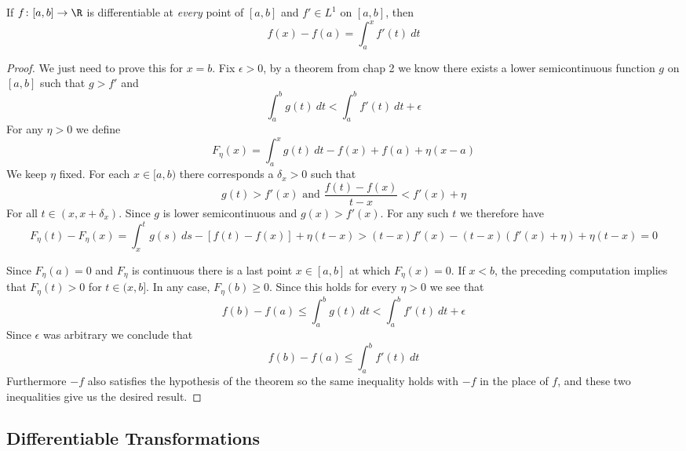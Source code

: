 \begin{theorem}
If $f\colon [a,b]\rightarrow \R$ is differentiable at \textit{every} point of $[a,b]$ and $f'\in L^1$ on $[a,b]$, then \[
    f(x)-f(a) = \int_a^x f'(t)~dt    
\]
\begin{proof}
    We just need to prove this for $x=b$. Fix $\epsilon>0$, by a theorem from chap 2 we know there exists a lower semicontinuous function $g$ on $[a,b]$ such that $g>f'$ and \[
        \int_a^b g(t)~dt<\int_a^b f'(t)~dt+\epsilon    
    \]
    For any $\eta>0$ we define \[
        F_\eta(x) = \int_a^x g(t)~dt - f(x)+f(a)+\eta(x-a)    
    \]
    We keep $\eta$ fixed. For each $x\in [a,b)$ there corresponds a $\delta_x>0$ such that\[
        g(t)>f'(x) \text{ and }\frac{f(t)-f(x)}{t-x}<f'(x)+\eta    
    \]
    For all $t\in (x,x+\delta_x)$. Since $g$ is lower semicontinuous and $g(x)>f'(x)$. For any such $t$ we therefore have\[
        F_\eta(t) - F_\eta(x) = \int_x^t g(s)~ds - [f(t)-f(x)]+\eta(t-x) > (t-x)f'(x)-(t-x)(f'(x)+\eta)+\eta(t-x) = 0    
    \]

    Since $F_\eta(a) = 0$ and $F_\eta$ is continuous there is a last point $x\in [a,b]$ at which $F_\eta(x) = 0$. If $x<b$, the preceding computation implies that $F_\eta(t)>0$ for $t\in (x,b]$. In any case, $F_\eta(b)\geq 0$. Since this holds for every $\eta>0$ we see that \[
    f(b)-f(a)\leq \int_a^b g(t)~dt< \int_a^b f'(t)~dt + \epsilon    
\] 
    Since $\epsilon$ was arbitrary we conclude that \[f(b)-f(a)\leq \int_a^b f'(t)~dt\] Furthermore $-f$ also satisfies the hypothesis of the theorem so the same inequality holds with $-f$ in the place of $f$, and these two inequalities give us the desired result.
\end{proof}
\end{theorem}
\subsection{Differentiable Transformations}

